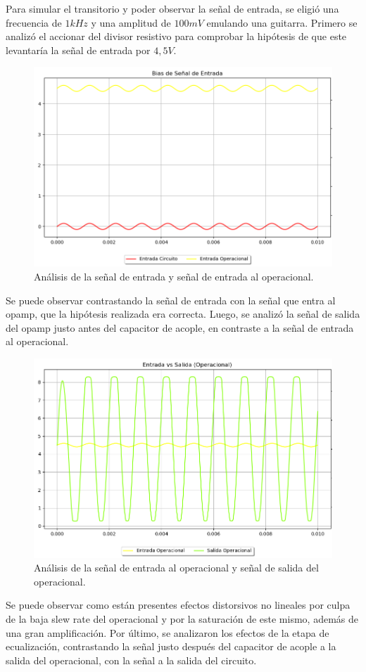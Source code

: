 Para simular el transitorio y poder observar la señal de entrada, se eligió una frecuencia de $1kHz$ y una amplitud de $100mV$ emulando una guitarra.
Primero se analizó el accionar del divisor resistivo para comprobar la hipótesis de que este levantaría la señal de entrada por $4,5V$.
\begin{figure}[H]
	\centering
	\includegraphics[width=1\textwidth, trim={0 0 0 0}, clip]{Ejercicio5/Imagenes/Circuito_base/Sim/circuito_base_tran_vi_viop.png}
	\caption{Análisis de la señal de entrada y señal de entrada al operacional.}
	\label{fig:sim_base}
\end{figure}
Se puede observar contrastando la señal de entrada con la señal que entra al opamp, que la hipótesis realizada era correcta.
Luego, se analizó la señal de salida del opamp justo antes del capacitor de acople, en contraste a la señal de entrada al operacional.
\begin{figure}[H]
	\centering
	\includegraphics[width=1\textwidth, trim={0 0 0 0}, clip]{Ejercicio5/Imagenes/Circuito_base/Sim/circuito_base_tran_viop_voop.png}
	\caption{Análisis de la señal de entrada al operacional y señal de salida del operacional. }
	\label{fig:sim_base}
\end{figure}
Se puede observar como están presentes efectos distorsivos no lineales por culpa de la baja slew rate del operacional y por la saturación de este mismo, además de una gran amplificación.
Por último, se analizaron los efectos de la etapa de ecualización, contrastando la señal justo después del capacitor de acople a la salida del operacional, con la señal a la salida del circuito.

